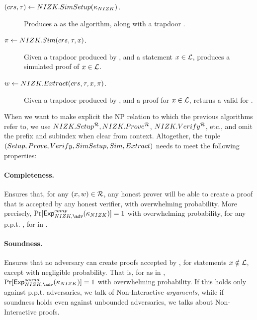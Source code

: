 \begin{description}
\item[$(crs,\tau) \gets NIZK.SimSetup(\kappa_{NIZK})$.] Produces a
  \NIZKcrs as the \NIZKSetup algorithm, along with a trapdoor \NIZKtrap.
\item[$\pi \gets NIZK.Sim(crs,\tau,x)$.] Given a trapdoor
  \NIZKtrap produced by \NIZKSimSetup, and a statement $x \in \mathcal{L}$,
  produces a simulated proof \NIZKproof of $x \in \mathcal{L}$.
\item[$w \gets NIZK.Extract(crs,\tau,x,\pi)$.] Given
  a trapdoor \NIZKtrap produced by \NIZKSimSetup, and a proof \NIZKproof for
  $x \in \mathcal{L}$, returns a valid \NIZKw for \NIZKx.
\end{description}

When we want to make explicit the NP relation \NIZKRel to which the previous
algorithms refer to, we use $NIZK.Setup^\mathcal{R},NIZK.Prove^\mathcal{R}$, 
$NIZK.Verify^\mathcal{R}$, etc., and omit the \NIZK prefix and subindex when clear
from context. Altogether, the tuple $(Setup,Prove,Verify,SimSetup,Sim,
Extract)$ needs to meet the following properties:

\paragraph{Completeness.} %
Ensures that, for any $(x,w) \in \mathcal{R}$, any honest prover will be
able to create a proof \NIZKproof that is accepted by any honest verifier, with
overwhelming probability. More precisely, $\Pr\lbrack\ExpNIZKComp(\NIZKsecpar)
\rbrack = 1$ with overwhelming probability, for any p.p.t. \adv, for
\ExpNIZKComp in .

\paragraph{Soundness.} %
Ensures that no adversary can create proofs accepted by \Verify, for
statements $x \notin \mathcal{L}$, except with negligible probability. That
is, for \ExpNIZKSound as in , $\Pr\lbrack\ExpNIZKSound
(\NIZKsecpar)\rbrack=1$ with overwhelming probability. If this holds only
against p.p.t. adversaries, we talk of Non-Interactive \emph{arguments}, while
if soundness holds even against unbounded adversaries, we talks about
Non-Interactive proofs.

